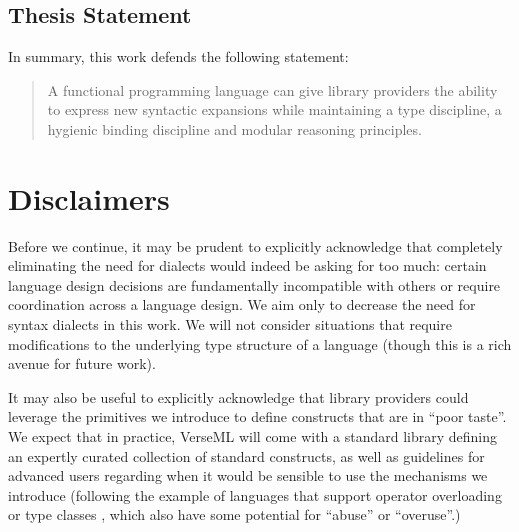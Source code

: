 \subsection*{Thesis Statement}
In summary, this work defends the following statement:

\begin{quote}
A functional programming language can give library providers the ability to %
express new syntactic expansions while maintaining a type discipline, a hygienic binding discipline and modular reasoning principles. %
\end{quote}
\section{Disclaimers}
Before we continue, it may be prudent to explicitly acknowledge that completely eliminating the need for dialects would indeed be asking for too much: certain language design decisions are fundamentally incompatible with others or require coordination across a language design. We aim only to decrease the need for syntax dialects in this work. We will not consider situations that require modifications to the underlying type structure of a language (though this is a rich avenue for future work). %

It may also be useful to explicitly acknowledge that library providers could leverage the primitives we introduce   to define constructs that are in ``poor taste''. We  expect that in practice, VerseML will come with a standard library defining an expertly curated collection of standard constructs, as well as guidelines for advanced users regarding when it would be sensible to use the mechanisms we introduce (following the example of languages that support operator overloading or type classes \cite{Hall:1996:TCH:227699.227700}, which also have some potential for ``abuse'' or ``overuse''.) %


